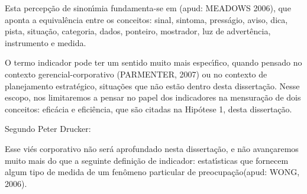 \documentclass[
12pt,		%
openright,	%
twoside,  %
a4paper,			%
chapter=TITLE,		%
english,			%
french,				%
spanish,			%
brazil				%
]{USPSC-classe/USPSC}
\begin{document}
Esta percep\c{c}\~ao de sinon\'{\i}mia fundamenta-se em (apud: MEADOWS 2006), que aponta a equival\^encia entre os conceitos: sinal, sintoma, press\'agio, aviso, dica, pista, situa\c{c}\~ao, categoria, dados, ponteiro, mostrador, luz de advert\^encia, instrumento e medida.

















O termo \textquotedbl  indicador \textquotedbl  pode ter um sentido muito mais espec\'{\i}fico, quando pensado no contexto gerencial-corporativo (PARMENTER, 2007) ou no contexto de planejamento estrat\'egico, situa\c{c}\~oes que n\~ao est\~ao dentro desta disserta\c{c}\~ao. Nesse escopo, nos limitaremos a pensar no papel dos indicadores na mensura\c{c}\~ao de dois conceitos: efic\'acia e efici\^encia, que s\~ao citadas na Hip\'otese 1, desta disserta\c{c}\~ao.

















Segundo Peter Drucker:


















\noindent\begin{center}\mbox{\centering{}}\end{center}


Esse vi\'es corporativo n\~ao ser\'a aprofundado nesta disserta\c{c}\~ao, e n\~ao avan\c{c}aremos muito mais do que a seguinte defini\c{c}\~ao de indicador: \textquotedbl estat\'{\i}sticas que fornecem algum tipo de medida de um fen\^omeno particular de preocupa\c{c}\~ao\textquotedbl  (apud: WONG, 2006).
\end{document}
